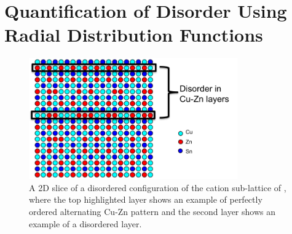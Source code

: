 \section{Quantification of Disorder Using Radial Distribution Functions}\label{RDF_methods}

\begin{figure}[h!]
  \centering
    \includegraphics[width=0.8\textwidth]{figures/Cu-Zn_disorder.png}
    \caption{A 2D slice of a disordered configuration of the cation sub-lattice of {\CZTS}, where the top highlighted layer shows an example of perfectly ordered alternating Cu-Zn pattern and the second layer shows an example of a disordered layer.}
  \label{Cu-Zn_disorder}
\end{figure}

